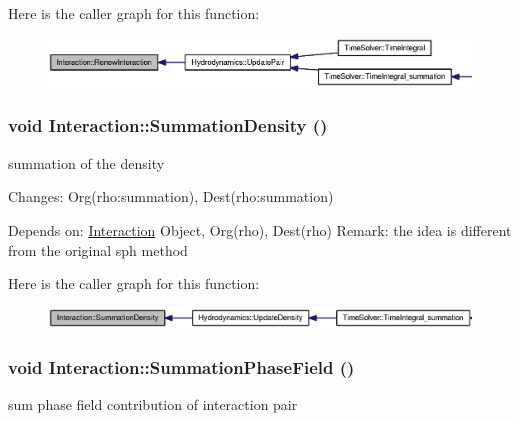Here is the caller graph for this function:\nopagebreak
\begin{figure}[H]
\begin{center}
\leavevmode
\includegraphics[width=323pt]{classInteraction_1adb37756172d95124e56556c9008120_icgraph}
\end{center}
\end{figure}
\hypertarget{classInteraction_8151e605eb5d7695e0203e2f126c7b4c}{
\subsubsection[{SummationDensity}]{\setlength{\rightskip}{0pt plus 5cm}void Interaction::SummationDensity ()}}
\label{classInteraction_8151e605eb5d7695e0203e2f126c7b4c}


summation of the density 

Changes: Org(rho:summation), Dest(rho:summation)\par
 Depends on: \hyperlink{classInteraction}{Interaction} Object, Org(rho), Dest(rho) Remark: the idea is different from the original sph method 

Here is the caller graph for this function:\nopagebreak
\begin{figure}[H]
\begin{center}
\leavevmode
\includegraphics[width=335pt]{classInteraction_8151e605eb5d7695e0203e2f126c7b4c_icgraph}
\end{center}
\end{figure}
\hypertarget{classInteraction_6c0000b8eaede20c1d3576013195d71f}{
\subsubsection[{SummationPhaseField}]{\setlength{\rightskip}{0pt plus 5cm}void Interaction::SummationPhaseField ()}}
\label{classInteraction_6c0000b8eaede20c1d3576013195d71f}


sum phase field contribution of interaction pair 

